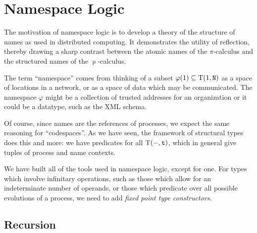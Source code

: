 \section{Namespace Logic}
\label{sec:namelog}

The motivation of namespace logic is to develop a theory of the structure of names as used in distributed computing. It demonstrates the utility of reflection, thereby drawing a sharp contrast between the atomic names of the $\pi$-calculus and the structured names of the $\uprho$-calculus.


  The term ``namespace'' comes from thinking of a subset $\varphi(1) \subseteq \mathrm{T}(1,\mathtt{N})$ as a space of locations in a network, or as a space of data which may be communicated. The namespace $\varphi$ might be a collection of trusted addresses for an organization or it could be a datatype, such as the XML schema.

  Of course, since names are the references of processes, we expect the same reasoning for ``codespaces''. As we have seen, the framework of structural types does this and more: we have predicates for all $\mathrm{T}(-,\mathtt{t})$, which in general give tuples of process and name contexts.

  We have built all of the tools used in namespace logic, except for one. For types which involve infinitary operations, such as those which allow for an indeterminate number of operands, or those which predicate over all possible evolutions of a process, we need to add \textit{fixed point type constructors}.

\subsection{Recursion}
\label{ssec:rec}

